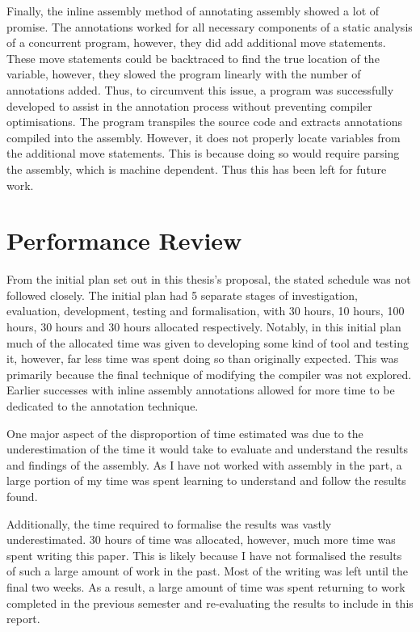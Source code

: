 Finally, the inline assembly method of annotating assembly showed a lot of promise. The annotations worked for all necessary components of a static analysis of a concurrent program, however, they did add additional move statements. These move statements could be backtraced to find the true location of the variable, however, they slowed the program linearly with the number of annotations added. Thus, to circumvent this issue, a program was successfully developed to assist in the annotation process without preventing compiler optimisations. The program transpiles the source code and extracts annotations compiled into the assembly. However, it does not properly locate variables from the additional move statements. This is because doing so would require parsing the assembly, which is machine dependent. Thus this has been left for future work.

\section{Performance Review}
From the initial plan set out in this thesis's proposal, the stated schedule was not followed closely. The initial plan had 5 separate stages of investigation, evaluation, development, testing and formalisation, with 30 hours, 10 hours, 100 hours, 30 hours and 30 hours allocated respectively. Notably, in this initial plan much of the allocated time was given to developing some kind of tool and testing it, however, far less time was spent doing so than originally expected. This was primarily because the final technique of modifying the compiler was not explored. Earlier successes with inline assembly annotations allowed for more time to be dedicated to the annotation technique.

One major aspect of the disproportion of time estimated was due to the underestimation of the time it would take to evaluate and understand the results and findings of the assembly. As I have not worked with assembly in the part, a large portion of my time was spent learning to understand and follow the results found. 

Additionally, the time required to formalise the results was vastly underestimated. 30 hours of time was allocated, however, much more time was spent writing this paper. This is likely because I have not formalised the results of such a large amount of work in the past. Most of the writing was left until the final two weeks. As a result, a large amount of time was spent returning to work completed in the previous semester and re-evaluating the results to include in this report.

